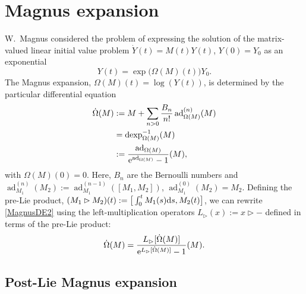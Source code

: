 \documentclass[10pt,a4paper]{amsart}
\numberwithin{equation}{section}
\begin{document}
\section{Magnus expansion}\label{s3}

W.~Magnus \cite{WM54} considered the problem of expressing the solution of the matrix-valued linear initial value problem $\dot Y(t) = M(t)Y(t)$, $Y(0)=Y_0$ as an exponential \cite{BCOR08,MP1970}
\begin{displaymath}
Y(t)=\exp\big({\Omega}(M)(t)\big)Y_0.
\end{displaymath}
The Magnus expansion, ${\Omega}(M)(t)=\log (Y(t))$, is determined by the particular differential equation
\begin{align}
\dot{\Omega}(M) &:=M + \sum_{n>0} \frac{B_n}{n!} \operatorname{ad}_{{\Omega}(M)}^{(n)}(M) \label{MagnusDE1}\\
 &= \operatorname{dexp}^{-1}_{\Omega(M)}(M) \nonumber\\
 &:= \frac{\operatorname{ad}_{\Omega(M)}}{{\rm e}^{\operatorname{ad}_{\Omega(M)}} - 1}(M) \label{MagnusDE2},
\end{align}
with $\Omega(M)(0)=0$. Here, $B_n$ are the Bernoulli numbers and $\operatorname{ad}_{M_1}^{(n)}(M_2):=\operatorname{ad}_{M_1}^{(n-1)}([M_1,M_2])$, $\operatorname{ad}_{M_1}^{(0)}(M_2)=M_2$. Defining the pre-Lie product, $(M_1 \rhd M_2)(t):=\big[\int_0^tM_1(s){\rm d}s,M_2(t)\big]$, we can rewrite \eqref{MagnusDE2} using the left-multiplication operators $L_\rhd(x):=x\rhd -$ defined in terms of the pre-Lie product:
\begin{displaymath}
\dot{\Omega}(M) = \frac{L_\rhd[{\dot{\Omega}(M)}]}{{\rm e}^{L_\rhd[{\dot{\Omega}(M)}]} - 1}(M).
\end{displaymath}

\subsection{Post-Lie Magnus expansion}
\end{document}
